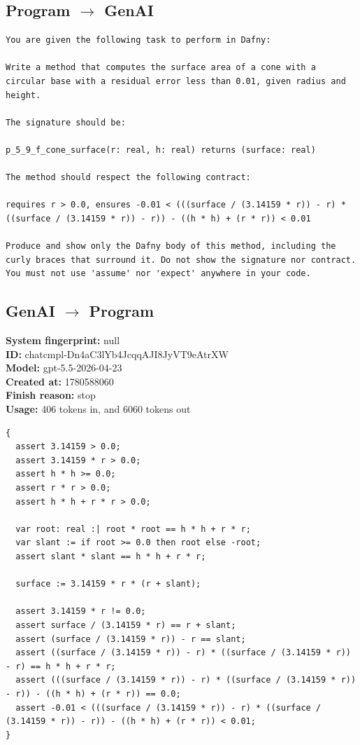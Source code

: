 \documentclass{article}
\begin{document}
\subsection*{Program $\rightarrow$ GenAI}
\begin{lstlisting}
You are given the following task to perform in Dafny:

Write a method that computes the surface area of a cone with a circular base with a residual error less than 0.01, given radius and height.

The signature should be:

p_5_9_f_cone_surface(r: real, h: real) returns (surface: real)

The method should respect the following contract:

requires r > 0.0, ensures -0.01 < (((surface / (3.14159 * r)) - r) * ((surface / (3.14159 * r)) - r)) - ((h * h) + (r * r)) < 0.01

Produce and show only the Dafny body of this method, including the curly braces that surround it. Do not show the signature nor contract. You must not use 'assume' nor 'expect' anywhere in your code.
\end{lstlisting}
\subsection*{GenAI $\rightarrow$ Program}
\textbf{System fingerprint: }null
\\\textbf{ID: }chatcmpl-Dn4aC3lYb4JcqqAJI8JyVT9eAtrXW
\\\textbf{Model: }gpt-5.5-2026-04-23
\\\textbf{Created at: }1780588060
\\\textbf{Finish reason: }stop
\\\textbf{Usage: }406 tokens in, and 6060 tokens out
\begin{lstlisting}
{
  assert 3.14159 > 0.0;
  assert 3.14159 * r > 0.0;
  assert h * h >= 0.0;
  assert r * r > 0.0;
  assert h * h + r * r > 0.0;

  var root: real :| root * root == h * h + r * r;
  var slant := if root >= 0.0 then root else -root;
  assert slant * slant == h * h + r * r;

  surface := 3.14159 * r * (r + slant);

  assert 3.14159 * r != 0.0;
  assert surface / (3.14159 * r) == r + slant;
  assert (surface / (3.14159 * r)) - r == slant;
  assert ((surface / (3.14159 * r)) - r) * ((surface / (3.14159 * r)) - r) == h * h + r * r;
  assert (((surface / (3.14159 * r)) - r) * ((surface / (3.14159 * r)) - r)) - ((h * h) + (r * r)) == 0.0;
  assert -0.01 < (((surface / (3.14159 * r)) - r) * ((surface / (3.14159 * r)) - r)) - ((h * h) + (r * r)) < 0.01;
}
\end{lstlisting}
\end{document}
